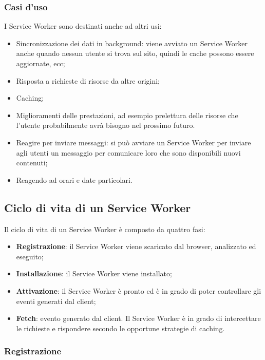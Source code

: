\documentclass[11pt ,a4paper , twoside , openright ]{article}
\begin{document}
\subsubsection{Casi d'uso}
I Service Worker sono destinati anche ad altri usi:
\begin{itemize}
	\item Sincronizzazione dei dati in background: viene avviato un Service Worker anche quando nessun utente si trova sul sito, quindi le cache possono essere aggiornate, ecc;
	\item Risposta a richieste di risorse da altre origini;
	\item Caching;
	\item Miglioramenti delle prestazioni, ad esempio prelettura delle risorse che l'utente probabilmente avrà bisogno nel prossimo futuro.
	\item Reagire per inviare messaggi: si può avviare un Service Worker per inviare agli utenti un messaggio per comunicare loro che sono disponibili nuovi contenuti;
	\item Reagendo ad orari e date particolari.
\end{itemize}

\subsection{Ciclo di vita di un Service Worker}
Il ciclo di vita di un Service Worker \cite{rif20, rif21, rif26} è composto da quattro fasi:
\begin{itemize}
	\item \textbf{Registrazione}: il Service Worker viene scaricato dal browser, analizzato ed eseguito;
	\item \textbf{Installazione}: il Service Worker viene installato;
	\item \textbf{Attivazione}: il Service Worker è pronto ed è in grado di poter controllare gli eventi generati dal client;
	\item\textbf{ Fetch}: evento generato dal client. Il Service Worker è in grado di intercettare le richieste e rispondere secondo le opportune strategie di caching. 
\end{itemize}

\subsubsection{Registrazione}
\end{document}
